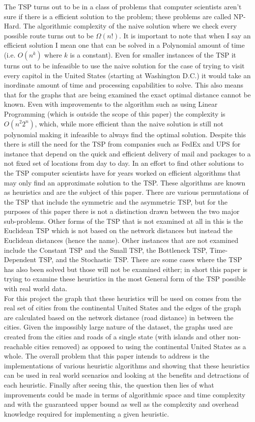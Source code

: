 \documentclass[midd]{thesis}
\newcommand{\tab}{\hspace*{2em}}
\begin{document}
\tab The TSP turns out to be in a class of problems that computer scientists aren't sure if there is a efficient solution to the problem; these problems are called NP-Hard. The algorithmic complexity of the naive solution where we check every possible route turns out to be $\Omega(n!)$. It is important to note that when I say an efficient solution I mean one that can be solved in a Polynomial amount of time (i.e. $O(n^k)$ where $k$ is a constant). Even for smaller instances of the TSP it turns out to be infeasible to use the naive solution for the case of trying to visit every capitol in the United States (starting at Washington D.C.) it would take an inordinate amount of time and processing capabilities to solve. This also means that for the graphs that are being examined the exact optimal distance cannot be known. Even with improvements to the algorithm such as using Linear Programming (which is outside the scope of this paper) the complexity is $O(n^{2}2^{n})$, which, while more efficient than the naive solution is still not polynomial making it  infeasible to always find the optimal solution. Despite this there is still the need for the TSP from companies such as FedEx and UPS for instance that depend on the quick and efficient delivery of mail and packages to a not fixed set of locations from day to day. In an effort to find other solutions to the TSP computer scientists have for years worked on efficient algorithms that may only find an approximate solution to the TSP. These algorithms are known as heuristics and are the subject of this paper. There are various permutations of the TSP that include the symmetric and the asymmetric TSP, but for the purposes of this paper there is not a distinction drawn between the two major sub-problems. Other forms of the TSP that is not examined at all in this is the Euclidean TSP which is not based on the network distances but instead the Euclidean distances (hence the name). Other instances that are not examined include the Constant TSP and the Small TSP, the Bottleneck TSP, Time-Dependent TSP, and the Stochastic TSP. There are some cases where the TSP has also been solved but those will not be examined either; in short this paper is trying to examine these heuristics in the most General form of the TSP possible with real world data.\\
\tab For this project the graph that these heuristics will be used on comes from the real set of cities from the continental United States and the edges of the graph are calculated based on the network distance (road distance) in between the cities. Given the impossibly large nature of the dataset, the graphs used are created from the cities and roads of a single state (with islands and other non-reachable cities removed) as opposed to using the continental United States as a whole. The overall problem that this paper intends to address is the implementations of various heuristic algorithms and showing that these heuristics can be used in real world scenarios and looking at the benefits and detractions of each heuristic. Finally after seeing this, the question then lies of what improvements could be made in terms of algorithmic space and time complexity and with the guaranteed upper bound as well as the complexity and overhead knowledge required for implementing a given heuristic.\\
\end{document}
